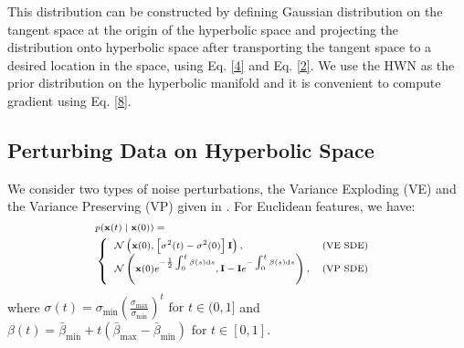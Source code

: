 \documentclass[letterpaper]{article} %
\begin{document}

This distribution can be constructed by defining Gaussian distribution on the tangent space at the origin of the hyperbolic space and projecting the distribution onto hyperbolic space after transporting the tangent space to a desired location in the space, using Eq. \eqref{4} and Eq. \eqref{2}. We use the HWN as the prior distribution on the hyperbolic manifold and it is convenient to compute gradient using Eq. \eqref{8}.

%
\subsection{Perturbing Data on Hyperbolic Space}
We consider two types of noise perturbations, the Variance Exploding (VE) and the Variance Preserving (VP) given in \cite{song2020score}. For Euclidean features, we have:
\begin{equation}\label{9}
\begin{scriptsize}{
\begin{aligned}
&p(\mathbf{x}(t) \mid \mathbf{x}(0))=\\ &\left\{\begin{array}{ll}
\mathcal{N}\left(\mathbf{x}(0),\left[\sigma^{2}(t)-\sigma^{2}(0)\right] \mathbf{I}\right), & \text {(VE SDE) } \\
\mathcal{N}\left(\mathbf{x}(0)e^{-\frac{1}{2} \int_{0}^{t} \beta(s) \mathrm{d} s} , \mathbf{I}-\mathbf{I} e^{-\int_{0}^{t} \beta(s) \mathrm{d} s}\right), & (\text{VP SDE)} \\
\end{array}\right.
\end{aligned}
}\end{scriptsize}
\end{equation}
%
where $\sigma(t)=\sigma_{\min }\left(\frac{\sigma_{\max }}{\sigma_{\min }}\right)^{t} \text { for } t \in(0,1]$ and $\beta(t)=\bar{\beta}_{\min }+t\left(\bar{\beta}_{\max }-\bar{\beta}_{\min }\right) \text { for } t \in[0,1]$.
\end{document}
